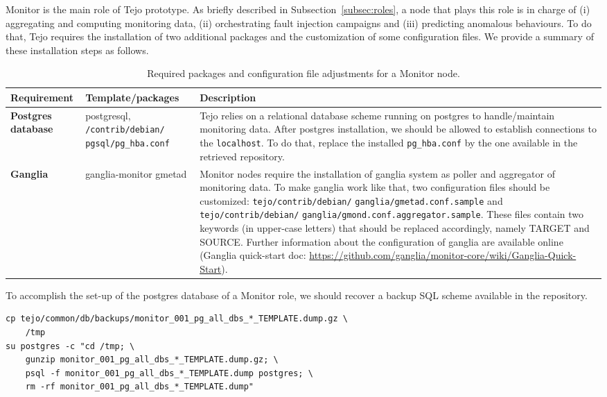 Monitor is the main role of Tejo prototype. As briefly described in Subsection~\ref{subsec:roles}, a node that plays this role is in charge of (i) aggregating and computing monitoring data, (ii) orchestrating fault injection campaigns and (iii) predicting anomalous behaviours. To do that, Tejo requires the installation of two additional packages and the customization of some configuration files. We provide a summary of these installation steps as follows.

			\begin{table}[htdp]
				\begin{center}
\caption{Required packages and configuration file adjustments for a Monitor node.}
  \label{tab:common_install_conf}
					\begin{tabular}{R{2.5cm} || L{4.5cm} L{6cm} }
						{\bf Requirement}&{\bf Template/packages}&{\bf Description} \\  
						\hline
						\hline
						{\bf Postgres database}& postgresql, \verb|/contrib/debian/| \verb|pgsql/pg_hba.conf|& Tejo relies on a relational database scheme running on postgres to handle/maintain monitoring data. After postgres installation, we should be allowed to establish connections to the \verb|localhost|. To do that, replace the installed \verb|pg_hba.conf| by the one available in the retrieved repository.\\
						\hline
						{\bf Ganglia}&ganglia-monitor gmetad & Monitor nodes require the installation of ganglia system as poller and aggregator of monitoring data. To make ganglia work like that, two configuration files should be customized: \verb|tejo/contrib/debian/| \verb|ganglia/gmetad.conf.sample| and \verb|tejo/contrib/debian/| \verb|ganglia/gmond.conf.aggregator.sample|. These files contain two keywords (in upper-case letters) that should be replaced accordingly, namely TARGET and SOURCE. Further information about the configuration of ganglia are available online (Ganglia quick-start doc: \url{https://github.com/ganglia/monitor-core/wiki/Ganglia-Quick-Start}).\\
					\end{tabular}
				\end{center}
			\end{table}

To accomplish the set-up of the postgres database of a Monitor role, we should recover a backup SQL scheme available in the repository.

\begin{lstlisting}
cp tejo/common/db/backups/monitor_001_pg_all_dbs_*_TEMPLATE.dump.gz \
	/tmp
su postgres -c "cd /tmp; \
	gunzip monitor_001_pg_all_dbs_*_TEMPLATE.dump.gz; \
	psql -f monitor_001_pg_all_dbs_*_TEMPLATE.dump postgres; \
	rm -rf monitor_001_pg_all_dbs_*_TEMPLATE.dump"
\end{lstlisting}

